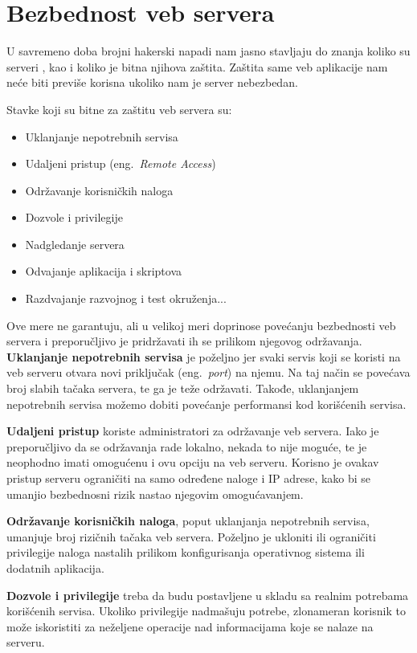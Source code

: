 \documentclass[a4paper]{article}
\begin{document}
\section{Bezbednost veb servera} \label{server}

U savremeno doba brojni hakerski napadi nam jasno stavljaju do znanja koliko su serveri , kao i koliko je bitna njihova zaštita. Zaštita same veb aplikacije nam neće biti previše korisna ukoliko nam je server nebezbedan.

Stavke koji su bitne za zaštitu veb servera su:
\begin{itemize}
	\item Uklanjanje nepotrebnih servisa
	\item Udaljeni pristup (eng.~{\em Remote Access})
	\item Održavanje korisničkih naloga
	\item Dozvole i privilegije
	\item Nadgledanje servera
	\item Odvajanje aplikacija i skriptova
	\item Razdvajanje razvojnog i test okruženja...
\end{itemize}

Ove mere ne garantuju, ali u velikoj meri doprinose povećanju bezbednosti veb servera i preporučljivo je pridržavati ih se prilikom njegovog održavanja.\\

\textbf{Uklanjanje nepotrebnih servisa} je poželjno jer svaki servis koji se koristi na veb serveru otvara novi priključak (eng.~{\em port}) na njemu. Na taj način se povećava broj slabih tačaka servera, te ga je teže održavati. Takođe, uklanjanjem nepotrebnih servisa možemo dobiti povećanje performansi kod korišćenih servisa.

\textbf{Udaljeni pristup} koriste administratori za održavanje veb servera. Iako je preporučljivo da se održavanja rade lokalno, nekada to nije moguće, te je neophodno imati omogućenu i ovu opciju na veb serveru. Korisno je ovakav pristup serveru ograničiti na samo određene naloge i IP adrese, kako bi se umanjio bezbednosni rizik nastao njegovim omogućavanjem.

\textbf{Održavanje korisničkih naloga}, poput uklanjanja nepotrebnih servisa, umanjuje broj rizičnih tačaka veb servera. Poželjno je ukloniti ili ograničiti privilegije naloga nastalih prilikom konfigurisanja operativnog sistema ili dodatnih aplikacija.

\textbf{Dozvole i privilegije} treba da budu postavljene u skladu sa realnim potrebama korišćenih servisa. Ukoliko privilegije nadmašuju potrebe, zlonameran korisnik to može iskoristiti za neželjene operacije nad informacijama koje se nalaze na serveru.
\end{document}
